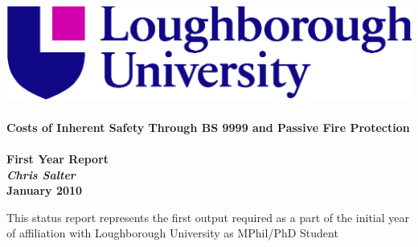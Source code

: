 \begin{titlepage}
 
\begin{center}
\includegraphics[scale=0.15]{./Pics/lulogo}\\[1cm]
\HRule \\[0.4cm]
{ \huge \bfseries Costs of Inherent Safety Through BS 9999 and Passive Fire Protection \\[0.4cm]

\HRule \\[1.5cm]

{\large \textbf{First Year Report}}
\\[1cm]
\emph{Chris Salter}
\\[1cm]
January 2010
\\[6cm]}
\end{center}
\normalsize This status report represents the first output required as a part of the initial year of affiliation with Loughborough University as MPhil/PhD Student 
 
\end{titlepage}
